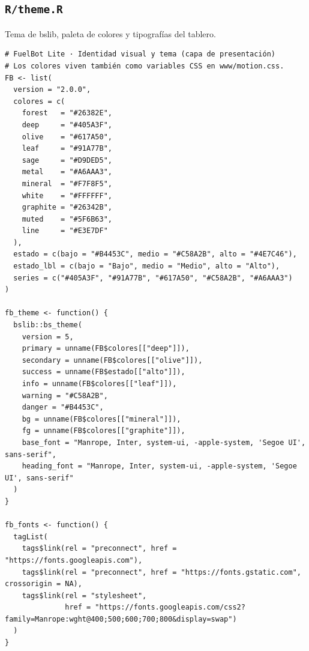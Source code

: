 \subsection{\texttt{R/theme.R}}
Tema de bslib, paleta de colores y tipografías del tablero.
\begin{lstlisting}[style=anexoR]
# FuelBot Lite · Identidad visual y tema (capa de presentación)
# Los colores viven también como variables CSS en www/motion.css.
FB <- list(
  version = "2.0.0",
  colores = c(
    forest   = "#26382E",
    deep     = "#405A3F",
    olive    = "#617A50",
    leaf     = "#91A77B",
    sage     = "#D9DED5",
    metal    = "#A6AAA3",
    mineral  = "#F7F8F5",
    white    = "#FFFFFF",
    graphite = "#26342B",
    muted    = "#5F6B63",
    line     = "#E3E7DF"
  ),
  estado = c(bajo = "#B4453C", medio = "#C58A2B", alto = "#4E7C46"),
  estado_lbl = c(bajo = "Bajo", medio = "Medio", alto = "Alto"),
  series = c("#405A3F", "#91A77B", "#617A50", "#C58A2B", "#A6AAA3")
)

fb_theme <- function() {
  bslib::bs_theme(
    version = 5,
    primary = unname(FB$colores[["deep"]]),
    secondary = unname(FB$colores[["olive"]]),
    success = unname(FB$estado[["alto"]]),
    info = unname(FB$colores[["leaf"]]),
    warning = "#C58A2B",
    danger = "#B4453C",
    bg = unname(FB$colores[["mineral"]]),
    fg = unname(FB$colores[["graphite"]]),
    base_font = "Manrope, Inter, system-ui, -apple-system, 'Segoe UI', sans-serif",
    heading_font = "Manrope, Inter, system-ui, -apple-system, 'Segoe UI', sans-serif"
  )
}

fb_fonts <- function() {
  tagList(
    tags$link(rel = "preconnect", href = "https://fonts.googleapis.com"),
    tags$link(rel = "preconnect", href = "https://fonts.gstatic.com", crossorigin = NA),
    tags$link(rel = "stylesheet",
              href = "https://fonts.googleapis.com/css2?family=Manrope:wght@400;500;600;700;800&display=swap")
  )
}
\end{lstlisting}

